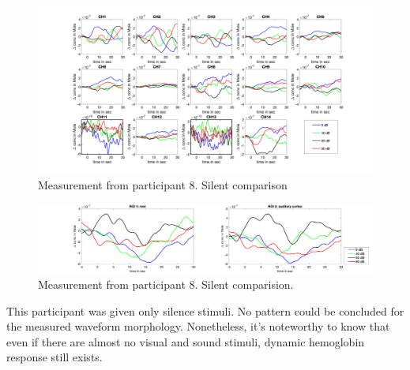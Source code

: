 \begin{figure}[H]
  \centering
    \includegraphics[scale=.4]{bilder/HbR_Mole/sub_luca2_s_HbR.png}
  \caption{Measurement from participant 8. Silent comparison}
\end{figure}

\begin{figure}[H]
  \centering
    \includegraphics[scale=.29]{bilder/ROI/sub_luca2_s_HbO.png}
  \caption{Measurement from participant 8. Silent comparision.}
\end{figure}

This participant was given only silence stimuli. No pattern could be concluded for the measured waveform morphology. Nonetheless, it's noteworthy to know that even if there are almost no visual and sound stimuli, dynamic hemoglobin response still exists.




